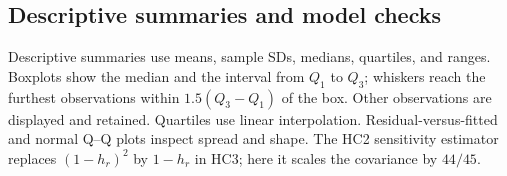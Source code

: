 \subsection{Descriptive summaries and model checks}
Descriptive summaries use means, sample SDs, medians, quartiles, and ranges. Boxplots show the median and the interval from $Q_1$ to $Q_3$; whiskers reach the furthest observations within $1.5(Q_3-Q_1)$ of the box. Other observations are displayed and retained. Quartiles use linear interpolation. Residual-versus-fitted and normal Q--Q plots inspect spread and shape. The HC2 sensitivity estimator replaces $(1-h_r)^2$ by $1-h_r$ in HC3; here it scales the covariance by $44/45$.

